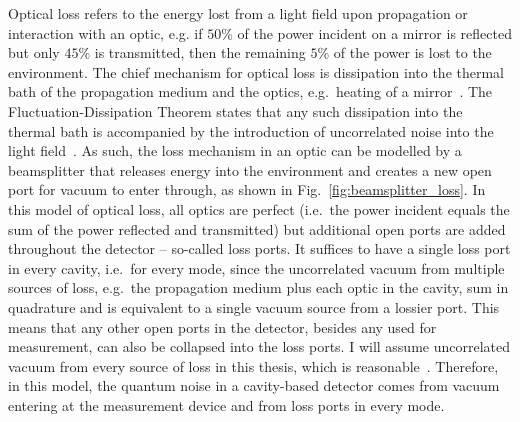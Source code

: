 Optical loss refers to the energy lost from a light field upon propagation or interaction with an optic, e.g. if $50\%$ of the power incident on a mirror is reflected but only $45\%$ is transmitted, then the remaining $5\%$ of the power is lost to the environment. The chief mechanism for optical loss is dissipation into the thermal bath of the propagation medium and the optics, e.g.\ heating of a mirror~\cite{}. The Fluctuation-Dissipation Theorem states that any such dissipation into the thermal bath is accompanied by the introduction of uncorrelated noise into the light field~\cite{}. As such, the loss mechanism in an optic can be modelled by a beamsplitter that releases energy into the environment and creates a new open port for vacuum to enter through, as shown in Fig.~\ref{fig:beamsplitter_loss}. In this model of optical loss, all optics are perfect (i.e.\ the power incident equals the sum of the power reflected and transmitted) but additional open ports are added throughout the detector -- so-called loss ports. It suffices to have a single loss port in every cavity, i.e.\ for every mode, since the uncorrelated vacuum from multiple sources of loss, e.g.\ the propagation medium plus each optic in the cavity, sum in quadrature and is equivalent to a single vacuum source from a lossier port. %
This means that any other open ports in the detector, besides any used for measurement, can also be collapsed into the loss ports. I will assume uncorrelated vacuum from every source of loss in this thesis, which is reasonable~\cite{}. Therefore, in this model, the quantum noise in a cavity-based detector comes from vacuum entering at the measurement device and from loss ports in every mode.

